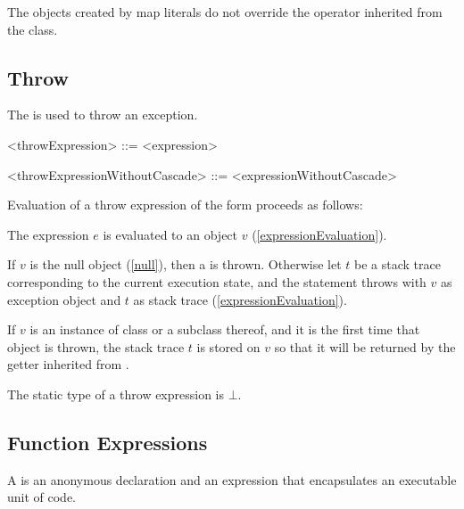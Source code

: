 \documentclass[makeidx]{article}
\begin{document}
{\LMHash{}%
The objects created by map literals do not override
the \lit{==} operator inherited from the  class.


\subsection{Throw}

\LMHash{}%
The  is used to throw an exception.

\begin{grammar}
<throwExpression> ::= \THROW{} <expression>

<throwExpressionWithoutCascade> ::= \THROW{} <expressionWithoutCascade>
\end{grammar}

\LMHash{}%
Evaluation of a throw expression of the form
proceeds as follows:

\LMHash{}%
The expression $e$ is evaluated to an object $v$
(\ref{expressionEvaluation}).


\LMHash{}%
If $v$ is the null object (\ref{null}), then a  is thrown.
Otherwise let $t$ be a stack trace corresponding to the current execution state,
and the \THROW{} statement throws with $v$ as exception object
and $t$ as stack trace (\ref{expressionEvaluation}).

\LMHash{}%
If $v$ is an instance of class  or a subclass thereof,
and it is the first time that  object is thrown,
the stack trace $t$ is stored on $v$ so that it will be returned
by the  getter inherited from .


\LMHash{}%
The static type of a throw expression is $\bot$.


\subsection{Function Expressions}

\LMHash{}%
A 
is an anonymous declaration and an expression
that encapsulates an executable unit of code.

}
\end{document}
